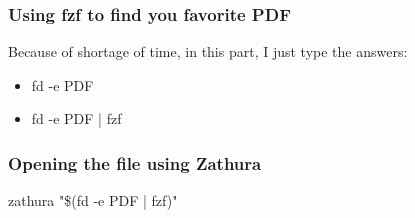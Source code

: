\documentclass{article}
\begin{document}
	\subsubsection{Using fzf to find you favorite PDF}
	Because of shortage of time, in this part, I just type the answers:
	\begin{itemize}
		
		\item fd -e PDF

		\item fd -e PDF | fzf

	\end{itemize}

	\subsubsection{Opening the file using Zathura}
	zathura "\$(fd -e PDF | fzf)"
\end{document}
